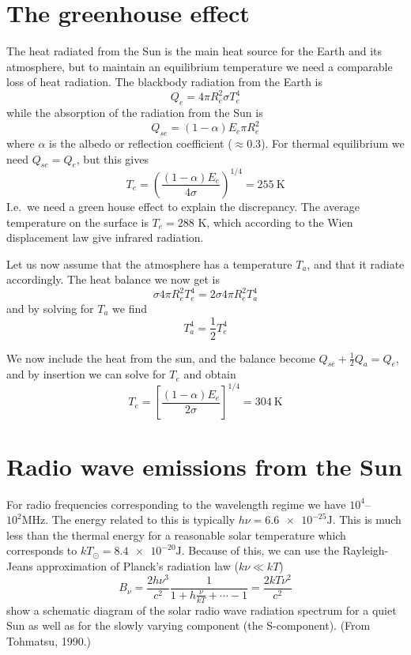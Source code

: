 \section{The greenhouse effect}
The heat radiated from the Sun is the main heat source for the Earth and its atmosphere, but to maintain an equilibrium temperature we need a comparable loss of heat radiation. The blackbody radiation from the Earth is
\begin{equation*}
    Q_e=4\pi R_e^2\sigma T_e^4
\end{equation*}
while the absorption of the radiation from the Sun is
\begin{equation*}
    Q_{se}=\left(1-\alpha\right)E_e\pi R_e^2
\end{equation*}
where \(\alpha \) is the albedo or reflection coefficient (\(\approx 0.3\)). For thermal equilibrium we need \(Q_{se}=Q_e\), but this gives
\begin{equation*}
    T_e={\left(\frac{(1-\alpha)E_e}{4\sigma}\right)}^{1/4}=\SI{255}{\kelvin}
\end{equation*}
I.e.\ we need a green house effect to explain the discrepancy. The average temperature on the surface is \(T_e=288\) K, which according to the Wien displacement law give infrared radiation.

Let us now assume that the atmosphere has a temperature \(T_a\), and that it radiate accordingly. The heat balance we now get is
\begin{equation*}
    \sigma 4\pi R_e^2T_e^4=2\sigma 4\pi R_e^2T_a^4
\end{equation*}
and by solving for \(T_a\) we find
\begin{equation*}
    T_a^4=\frac{1}{2}T_e^4
\end{equation*}

We now include the heat from the sun, and the balance become \(Q_{se}+\frac{1}{2}Q_a=Q_e\), and by insertion we can solve for \(T_e\) and obtain
\begin{equation*}
    T_e={\left[\frac{(1-\alpha)E_e}{2\sigma}\right]}^{1/4}=\SI{304}{\kelvin}
\end{equation*}

\section{Radio wave emissions from the Sun}
For radio frequencies corresponding to the wavelength regime we have \(10^4\)--\(10^2\si{\mega\hertz}\). The energy related to this is typically \(h\nu=\num{6.6e-25}\si{\joule}\). This is much less than the thermal energy for a reasonable solar temperature which corresponds to \(kT_\odot=\num{8.4e-20}\si{\joule}\). Because of this, we can use the Rayleigh-Jeans approximation of Planck's radiation law (\(k\nu\ll kT\))
\begin{equation}\label{eq:L9_rayleigh_jeans}
    B_\nu=\frac{2h\nu^3}{c^2}\frac{1}{1+h\frac{\nu}{kT}+\cdots -1}=\frac{2kT\nu^2}{c^2}
\end{equation}
 show a schematic diagram of the solar radio wave radiation spectrum for a quiet Sun as well as for the slowly varying component (the S-component). (From Tohmatsu, 1990.)


